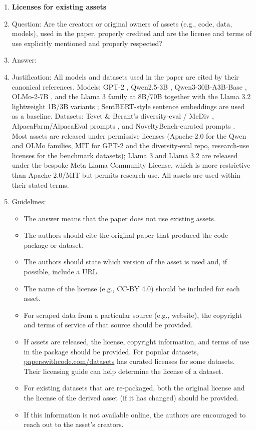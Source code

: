 \begin{enumerate}
\item {\bf Licenses for existing assets}
    \item[] Question: Are the creators or original owners of assets (e.g., code, data, models), used in the paper, properly credited and are the license and terms of use explicitly mentioned and properly respected?
    \item[] Answer: \answerYes{}
    \item[] Justification: All models and datasets used in the paper are cited by their canonical references. Models: GPT-2 \citep{radford2019language}, Qwen2.5-3B \citep{yang2024qwen25}, Qwen3-30B-A3B-Base \citep{yang2025qwen3}, OLMo-2-7B \citep{olmo2024olmo2}, and the Llama 3 family at 8B/70B \citep{grattafiori2024llama3} together with the Llama 3.2 lightweight 1B/3B variants \citep{meta2024llama32}; SentBERT-style sentence embeddings \citep{reimers2019sbert} are used as a baseline. Datasets: Tevet \& Berant's diversity-eval / McDiv \citep{tevet2020evaluating}, AlpacaFarm/AlpacaEval prompts \citep{dubois2024alpacafarm}, and NoveltyBench-curated prompts \citep{zhang2025noveltybench}. Most assets are released under permissive licenses (Apache-2.0 for the Qwen and OLMo families, MIT for GPT-2 and the diversity-eval repo, research-use licenses for the benchmark datasets); Llama 3 and Llama 3.2 are released under the bespoke Meta Llama Community License, which is more restrictive than Apache-2.0/MIT but permits research use. All assets are used within their stated terms.
    \item[] Guidelines:
    \begin{itemize}
        \item The answer \answerNA{} means that the paper does not use existing assets.
        \item The authors should cite the original paper that produced the code package or dataset.
        \item The authors should state which version of the asset is used and, if possible, include a URL.
        \item The name of the license (e.g., CC-BY 4.0) should be included for each asset.
        \item For scraped data from a particular source (e.g., website), the copyright and terms of service of that source should be provided.
        \item If assets are released, the license, copyright information, and terms of use in the package should be provided. For popular datasets, \url{paperswithcode.com/datasets} has curated licenses for some datasets. Their licensing guide can help determine the license of a dataset.
        \item For existing datasets that are re-packaged, both the original license and the license of the derived asset (if it has changed) should be provided.
        \item If this information is not available online, the authors are encouraged to reach out to the asset's creators.
    \end{itemize}


\end{enumerate}
